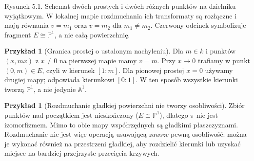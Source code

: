 \documentclass[11pt,a4paper,openany]{report}
\numberwithin{equation}{section}
\theoremstyle{plain}
\theoremstyle{definition}
\newtheorem{przyklad}[twierdzenie]{Przykład}
\theoremstyle{remark}
\newcommand{\A}{\mathbb A}
\newcommand{\PP}{\mathbb P}
\begin{document}
\begin{center}

{\small Rysunek 5.1. Schemat dwóch prostych i dwóch różnych punktów na dzielniku wyjątkowym. W lokalnej mapie rozdmuchania ich transformaty są rozłączne i mają równania $v=m_1$ oraz $v=m_2$ dla $m_1\ne m_2$. Czerwony odcinek symbolizuje fragment $E\cong\PP^1$, a nie całą powierzchnię.}\par
\end{center}

\begin{przyklad}[Granica prostej o ustalonym nachyleniu]
Dla $m\in k$ i punktów $(x,mx)$ z $x\ne0$ na
pierwszej mapie mamy $v=m$. Przy $x\to0$ trafiamy
w punkt $(0,m)\in E$, czyli w kierunek $[1:m]$.
Dla pionowej prostej $x=0$ używamy drugiej mapy;
odpowiada kierunkowi $[0:1]$. W ten sposób wszystkie
kierunki tworzą $\PP^1$, a nie jedynie $\A^1$.
\end{przyklad}

\begin{przyklad}[Rozdmuchanie gładkiej powierzchni nie tworzy osobliwości]
Zbiór punktów nad początkiem jest nieskończony
($E\cong\PP^1$), dlatego $\pi$ nie jest
izomorfizmem. Mimo to obie mapy współrzędnych są
gładkimi płaszczyznami. Rozdmuchanie nie jest więc
operacją usuwającą \emph{zawsze} pewną osobliwość:
można je wykonać również na przestrzeni gładkiej,
aby rozdzielić kierunki lub uzyskać miejsce na
bardziej przejrzyste przecięcia krzywych.
\end{przyklad}
\end{document}

